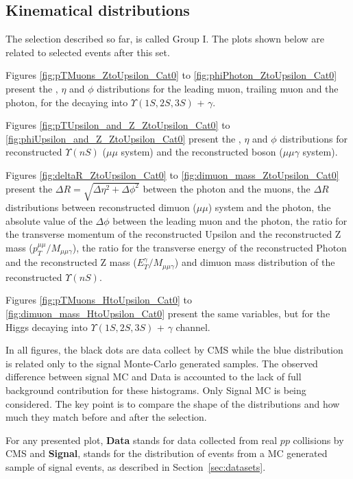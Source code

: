 \subsection{Kinematical distributions}
\label{sec:kin_plots_group_1}

The selection described so far, is called Group I. The plots shown below are related to selected events after this set. 

Figures \ref{fig:pTMuons_ZtoUpsilon_Cat0} to \ref{fig:phiPhoton_ZtoUpsilon_Cat0} present the \PT, $\eta$ and $\phi$ distributions for the leading muon, trailing muon and the photon, for the \Z decaying into $\Upsilon(1S,2S,3S)$ + $\gamma$. 

Figures \ref{fig:pTUpsilon_and_Z_ZtoUpsilon_Cat0} to \ref{fig:phiUpsilon_and_Z_ZtoUpsilon_Cat0} present the \PT, $\eta$ and $\phi$ distributions for reconstructed $\Upsilon(nS)$ ($\mu\mu$ system) and the reconstructed boson ($\mu\mu\gamma$ system).

Figures \ref{fig:deltaR_ZtoUpsilon_Cat0} to \ref{fig:dimuon_mass_ZtoUpsilon_Cat0} present the $\Delta R = \sqrt{\Delta\eta^2 + \Delta\phi^2}$ between the photon and the muons, the $\Delta R$ distributions between reconstructed dimuon ($\mu\mu$) system and the photon, the absolute value of the $\Delta \phi$ between the leading muon and the photon, the ratio for the transverse momentum of the reconstructed Upsilon and the reconstructed Z mass ($p_{T}^{\mu\mu}/M_{\mu\mu\gamma}$), the ratio for the transverse energy of the reconstructed Photon and the reconstructed Z mass ($E_{T}^{\gamma}/M_{\mu\mu\gamma}$) and dimuon mass distribution of the reconstructed $\Upsilon(nS)$.

Figures \ref{fig:pTMuons_HtoUpsilon_Cat0} to \ref{fig:dimuon_mass_HtoUpsilon_Cat0} present the same variables, but for the Higgs decaying into $\Upsilon(1S,2S,3S)$ + $\gamma$ channel.

In all figures, the black dots are data collect by CMS while the blue distribution is related only to the signal Monte-Carlo generated samples. The observed difference between signal MC and Data is accounted to the lack of full background contribution for these histograms. Only Signal MC is being considered. The key point is to compare the shape of the distributions and how much they match before and after the selection.

For any presented plot, \textbf{Data} stands for data collected from real $pp$ collisions by CMS and \textbf{Signal}, stands for the distribution of events from a MC generated sample of signal events, as described in Section~\ref{sec:datasets}.

